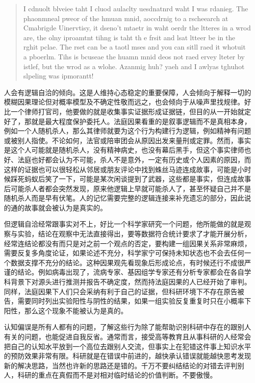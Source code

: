 \documentclass[]{tufte-book}
\begin{document}
\begin{quote}
I cdnuolt blveiee taht I cluod aulaclty uesdnatnrd waht I was rdanieg. The phaonmneal pweor of the hmuan mnid, aoccdrnig to a rscheearch at Cmabrigde Uinervtisy, it dseno't mtaetr in waht oerdr the ltteres in a wrod are, the olny iproamtnt tihng is taht th e frsit and lsat ltteer be in the rghit pclae. The rset can be a taotl mses and you can sitll raed it whotuit a pboerlm. Tihs is bcuseae the huamn mnid deos not raed ervey lteter by istlef, but the wrod as a wlohe. Azanmig huh? yaeh and I awlyas tghuhot slpeling was ipmorantt!
\end{quote}

人会有逻辑自洽的倾向。这是人维持心态稳定的重要保障，人会倾向于解释一切的模糊因果理论但对概率模型及不确定性敬而远之，也会倾向于从噪声里找规律。好比一个律师打官司，他要做的就是收集事实证据形成证据链，但目的从一开始就定好了，那就是最大程度保护委托人。法庭因果看重的是叙事逻辑而不是真相本身，例如一个人随机杀人，那么其律师就要为这个行为构建行为逻辑，例如精神有问题或被别人指使。不论如何，法官或陪审团会从原因出发来量刑或定罪。然而，事实是这个人可能就是随机杀人，没有精神病史，也没有幕后黑手，但这个事实律师也好、法庭也好都会认为不可能，杀人不是意外，一定有历史或个人因素的原因，而这样的证据也可以很轻松从邻居或朋友评论中找到蛛丝马迹连成故事，可能是小时候踩死蚂蚁后笑了一下，可能是某次闲谈提到了武器，这些都是事实，但连成故事后可能杀人者都会突然发现，原来他逻辑上早就可能杀人了，甚至怀疑自己并不是随机杀人而是早有伏笔。人的记忆需要完整的逻辑连接来补充遗忘的部分，因此说的通的故事就会被认为是真实的。

但逻辑自洽经常跟事实对不上，好比一个科学家研究一个问题，他所能做的就是观察与实验，结论在观察中无法直接得出，要等数据符合统计要求了才能开展分析，经常连结论都没有而只是对之前一个观点的否定，要构建一组因果关系非常麻烦，需要反复多角度论证，如果论述不充分，科学家宁可保持未知状态也不会去任何一个数据支撑不充分的结论。这种因果观先看现象后形成论点，有时候还行不成很严谨的结论。例如病毒出现了，流病专家、基因组学专家还有分析专家都会在各自学科背景下对源头进行推测并报告不确定度，然而持法庭因果的人已经开始了审判。同样，法庭因果下人们只会采纳有利于自己的证据，但科研环境下不存在原告被告，需要同时列出实验阳性与阴性的结果，如果一组实验反复重复时只在小概率下阳性，那么这个现象不能被认为是真的。

认知偏误是所有人都有的问题，了解这些行为除了能帮助识别科研中存在的跟别人有关的问题，也能促进自我反省。通常而言，接受高等教育且从事科研的人经常会把自己的认知水平放到一个高位去跟别人交流，但事实上在犯错这件事上知识水平的预防效果非常有限。科研就是在错误中前进的，越快承认错误就能越快思考发现新的解决思路，当然也许新的思路还是错的。千万不要纠结结论的对错去评判别人，科研的重点在真假而不是对相对临时结论的价值判断。不要傲慢。
\end{document}
